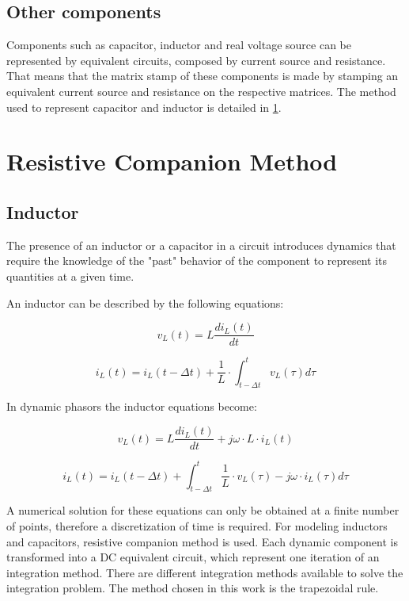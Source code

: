 \subsection{Other components}
Components such as capacitor, inductor and real voltage source can be represented by equivalent circuits, composed by current source and resistance. That means that the matrix stamp of these components is made by stamping an equivalent current source and resistance on the respective matrices. 
The method used to represent capacitor and inductor is detailed in \ref{ResistiveCompanion}.

 
\section{Resistive Companion Method} \label{ResistiveCompanion}

\subsection{Inductor} \label{ResistiveCompanionInductor}
The presence of an inductor or a capacitor in a circuit introduces dynamics that require the knowledge of the "past" behavior of the component to represent its quantities at a given time.

An inductor can be described by the following equations: 

\begin{equation}
        v_L(t) = L \frac{di_L(t)}{dt}
\end{equation}

\begin{equation}
        i_L(t) = i_L(t- \Delta t) + \frac{1}{L} \cdot \int_{t- \Delta t}^{t} v_L(\tau) d \tau 
\end{equation}

In dynamic phasors the inductor equations become:

\begin{equation}
        v_L(t) = L \frac{di_L(t)}{dt} + j \omega \cdot L \cdot  i_L(t)
\end{equation}

\begin{equation}
        i_L(t) = i_L(t- \Delta t) +  \int_{t- \Delta t}^{t} \frac{1}{L} \cdot v_L(\tau) -j \omega \cdot i_L(\tau)d \tau 
\end{equation}

A numerical solution for these equations can only be obtained at a finite number of points, therefore a discretization of time is required.
For modeling inductors and capacitors, resistive companion method is used. Each dynamic component is transformed into a DC equivalent circuit, which represent one iteration of an integration method.
There are different integration methods available to solve the integration problem. The method chosen in this work is the trapezoidal rule.

